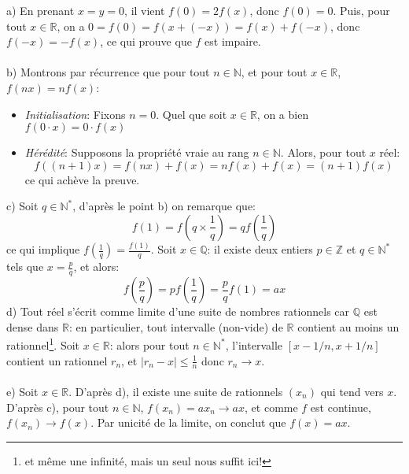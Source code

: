 a) En prenant $x=y=0$, il vient $f(0)=2f(x)$, donc $f(0)=0$. Puis, pour tout $x\in\mathbb{R}$, on a $0=f(0)=f(x+(-x))=f(x)+f(-x)$, donc $f(-x)=-f(x)$, ce qui prouve que $f$ est impaire.\\ \\
b) Montrons par récurrence que pour tout $n\in\mathbb{N}$, et pour tout $x\in\mathbb{R}$, $f(nx)=nf(x)$:
\begin{itemize}
  \item \textit{Initialisation}: Fixons $n=0$. Quel que soit $x\in\mathbb{R}$, on a bien $f(0\cdot x)=0\cdot f(x)$
  \item \textit{Hérédité}: Supposons la propriété vraie au rang $n\in\mathbb{N}$. Alors, pour tout $x$ réel:
  \[
  f((n+1)x) = f(nx)+f(x) = nf(x)+f(x) = (n+1)f(x)
  \]
  ce qui achève la preuve.
\end{itemize}
c) Soit $q\in\mathbb{N}^*$, d’après le point b) on remarque que: 
  \[ f\left( 1 \right) = f\left( q \times \frac{1}{q} \right) = qf\left(\frac{1}{q}\right) \]
ce qui implique $f\left(\frac{1}{q}\right) = \frac{f(1)}{q}$. Soit $x\in\mathbb{Q}$: il existe deux entiers $p\in\mathbb{Z}$ et $q\in\mathbb{N}^*$ tels que $x=\frac{p}{q}$, et alors:
\[
f\left(\frac{p}{q}\right) = pf\left(\frac{1}{q}\right) = \frac{p}{q}f(1) = ax
\]
d) Tout réel s’écrit comme limite d'une suite de nombres rationnels car $\mathbb{Q}$ est dense dans $\mathbb{R}$: en particulier, tout intervalle (non-vide) de $\mathbb{R}$ contient au moins un rationnel\footnote{et même une infinité, mais un seul nous suffit ici!}. Soit $x\in\mathbb{R}$: alors pour tout $n\in\mathbb{N}^*$, l'intervalle $[x-1/n, x+1/n]$ contient un rationnel $r_n$, et $|r_n-x|\leq \frac{1}{n}$ donc $r_n\to x$.\\ \\
e) Soit $x\in\mathbb{R}$. D’après d), il existe une suite de rationnels $(x_n)$ qui tend vers $x$. D’après c), pour tout $n\in\mathbb{N}$, $f(x_n)=ax_n\to ax$, et comme $f$ est continue, $f(x_n)\to f(x)$. Par unicité de la limite, on conclut que $f(x)=ax$.
